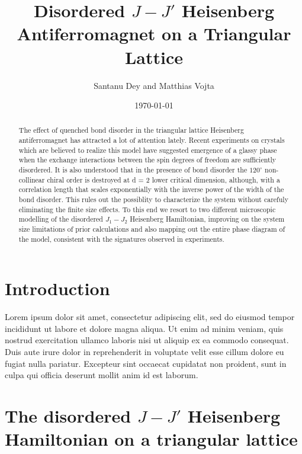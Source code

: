 \documentclass[aps,prb,twocolumn,showpacs]{revtex4-1}
\begin{document}
\title{Disordered $J-J'$ Heisenberg Antiferromagnet on a Triangular Lattice}
\author{Santanu Dey and Matthias Vojta}

\pacs{}
\date{\today}

\begin{abstract}

    The effect of quenched bond disorder in the triangular lattice 
    Heisenberg antiferromagnet has attracted a lot of attention lately.
    Recent experiments on crystals which are believed to realize this model
    have suggested emergence of a glassy phase when the exchange 
    interactions between the spin degrees of freedom are sufficiently 
    disordered. It is also understood that in the presence of bond disorder
    the $120^{\circ}$ non-collinear chiral order is destroyed at d = 2 lower 
    critical dimension, although, with a correlation length that scales 
    exponentially with the inverse power of the width of the bond disorder. 
    This rules out the possiblity to characterize the system without carefuly 
    eliminating the finite size effects. To this end we resort to two 
    different microscopic modelling of the disordered $J_1-J_2$ Heisenberg 
    Hamiltonian, improving on the system size limitations of prior 
    calculations and also mapping out the entire phase diagram of the 
    model, consistent with the signatures observed in experiments.

\end{abstract}

\maketitle

\section{Introduction}

Lorem ipsum dolor sit amet, consectetur adipiscing elit, sed do eiusmod tempor 
incididunt ut labore et dolore magna aliqua. Ut enim ad minim veniam, quis nostrud 
exercitation ullamco laboris nisi ut aliquip ex ea commodo consequat. Duis aute 
irure dolor in reprehenderit in voluptate velit esse cillum dolore eu fugiat nulla 
pariatur. Excepteur sint occaecat cupidatat non proident, sunt in culpa qui officia 
deserunt mollit anim id est laborum.

\section{The disordered $J-J'$ Heisenberg Hamiltonian on a triangular lattice}
\end{document}
